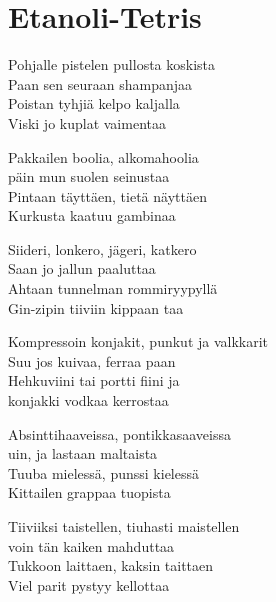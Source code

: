 \section{Etanoli-Tetris}

Pohjalle pistelen pullosta koskista\\
Paan sen seuraan shampanjaa\\
Poistan tyhjiä kelpo kaljalla\\
Viski jo kuplat vaimentaa

Pakkailen boolia, alkomahoolia\\
päin mun suolen seinustaa\\
Pintaan täyttäen, tietä näyttäen\\
Kurkusta kaatuu gambinaa

Siideri, lonkero, jägeri, katkero\\
Saan jo jallun paaluttaa\\
Ahtaan tunnelman rommiryypyllä\\
Gin-zipin tiiviin kippaan taa

Kompressoin konjakit, punkut ja valkkarit\\
Suu jos kuivaa, ferraa paan\\
Hehkuviini tai portti fiini ja \\
konjakki vodkaa kerrostaa

Absinttihaaveissa, pontikkasaaveissa\\
uin, ja lastaan maltaista\\
Tuuba mielessä, punssi kielessä\\
Kittailen grappaa tuopista

Tiiviiksi taistellen, tiuhasti maistellen\\
voin tän kaiken mahduttaa\\
Tukkoon laittaen, kaksin taittaen\\
Viel parit pystyy kellottaa